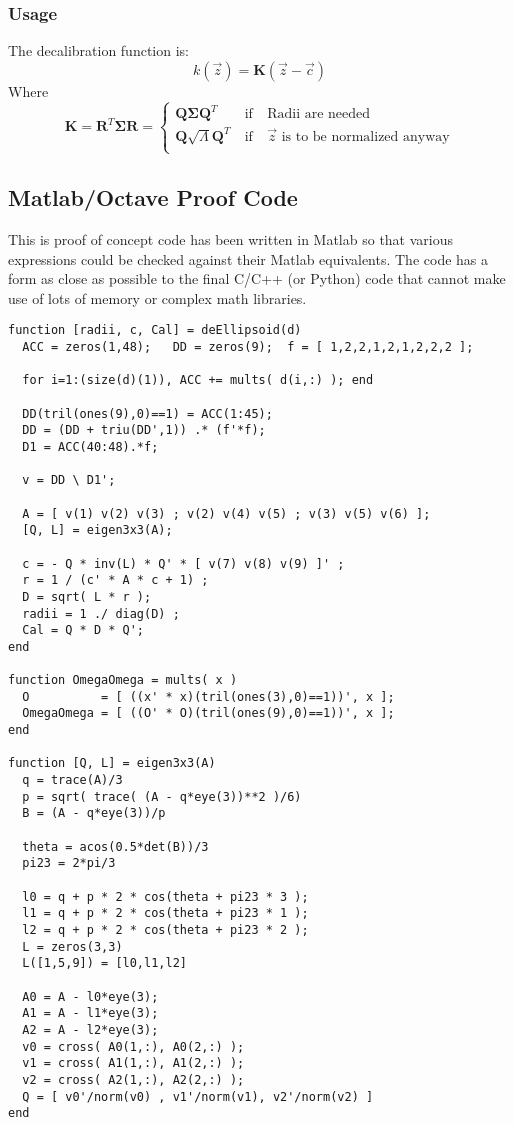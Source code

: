 \documentclass{article}
\def\mat#1{\mathbf{#1}}
\begin{document}
\subsubsection{Usage}
The decalibration function is:
\begin{equation}
k(\vec{z}) = \mat{K}\left( \vec{z} - \vec{c} \right)
\end{equation}
Where
\begin{equation}
\mat{K} 
= \mat{R}^T \mat{\Sigma} \mat{R}
= \left\{\begin{matrix}
\mat{Q} \mat{\Sigma} \mat{Q}^T &~\text{if}~&\text{Radii are needed} \\
\mat{Q} \sqrt{\Lambda} \mat{Q}^T &~\text{if}~&\vec{z}\text{ is to be normalized anyway}\\
\end{matrix}
\right.
\end{equation}
\subsection{Matlab/Octave Proof Code}
This is proof of concept code has been written in Matlab so that various
expressions could be checked against their Matlab equivalents. The
code has a form as close as possible to the final C/C++ (or Python)
code that cannot make use of lots of memory or complex math
libraries.
\begin{verbatim}
function [radii, c, Cal] = deEllipsoid(d)
  ACC = zeros(1,48);   DD = zeros(9);  f = [ 1,2,2,1,2,1,2,2,2 ];

  for i=1:(size(d)(1)), ACC += mults( d(i,:) ); end

  DD(tril(ones(9),0)==1) = ACC(1:45);
  DD = (DD + triu(DD',1)) .* (f'*f);
  D1 = ACC(40:48).*f;

  v = DD \ D1';

  A = [ v(1) v(2) v(3) ; v(2) v(4) v(5) ; v(3) v(5) v(6) ];
  [Q, L] = eigen3x3(A);

  c = - Q * inv(L) * Q' * [ v(7) v(8) v(9) ]' ;
  r = 1 / (c' * A * c + 1) ;
  D = sqrt( L * r );
  radii = 1 ./ diag(D) ;
  Cal = Q * D * Q';
end

function OmegaOmega = mults( x )
  O          = [ ((x' * x)(tril(ones(3),0)==1))', x ];
  OmegaOmega = [ ((O' * O)(tril(ones(9),0)==1))', x ];
end

function [Q, L] = eigen3x3(A)
  q = trace(A)/3
  p = sqrt( trace( (A - q*eye(3))**2 )/6)
  B = (A - q*eye(3))/p

  theta = acos(0.5*det(B))/3
  pi23 = 2*pi/3

  l0 = q + p * 2 * cos(theta + pi23 * 3 );
  l1 = q + p * 2 * cos(theta + pi23 * 1 );
  l2 = q + p * 2 * cos(theta + pi23 * 2 );
  L = zeros(3,3)
  L([1,5,9]) = [l0,l1,l2]

  A0 = A - l0*eye(3);
  A1 = A - l1*eye(3);
  A2 = A - l2*eye(3);
  v0 = cross( A0(1,:), A0(2,:) );
  v1 = cross( A1(1,:), A1(2,:) );
  v2 = cross( A2(1,:), A2(2,:) );
  Q = [ v0'/norm(v0) , v1'/norm(v1), v2'/norm(v2) ]
end 
\end{verbatim}
\end{document}
